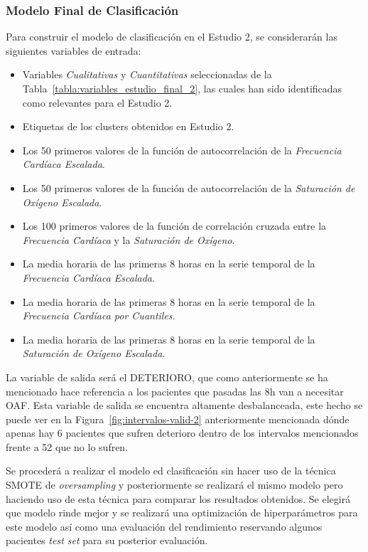 \subsubsection{Modelo Final de Clasificación}

Para construir el modelo de clasificación en el Estudio 2, se considerarán las siguientes variables de entrada:

\begin{itemize}
    \item Variables \textit{Cualitativas} y \textit{Cuantitativas} seleccionadas de la Tabla~\ref{tabla:variables_estudio_final_2}, las cuales han sido identificadas como relevantes para el Estudio 2.
    \item Etiquetas de los clusters obtenidos en Estudio 2.
    \item Los 50 primeros valores de la función de autocorrelación de la \textit{Frecuencia Cardíaca Escalada}.
    \item Los 50 primeros valores de la función de autocorrelación de la \textit{Saturación de Oxígeno Escalada}.
    \item Los 100 primeros valores de la función de correlación cruzada entre la \textit{Frecuencia Cardíaca} y la \textit{Saturación de Oxígeno}.
    \item La media horaria de las primeras 8 horas en la serie temporal de la \textit{Frecuencia Cardíaca Escalada}.
    \item La media horaria de las primeras 8 horas en la serie temporal de la \textit{Frecuencia Cardíaca por Cuantiles}.
    \item La media horaria de las primeras 8 horas en la serie temporal de la \textit{Saturación de Oxígeno Escalada}.
\end{itemize}

La variable de salida será el DETERIORO, que como anteriormente se ha mencionado hace referencia a los pacientes que  pasadas las 8h van a necesitar OAF. Esta variable de salida se encuentra altamente desbalanceada, este hecho se puede ver en la Figura~\ref{fig:intervalos-valid-2} anteriormente mencionada dónde apenas hay 6 pacientes que sufren deterioro dentro de los intervalos mencionados frente a 52 que no lo sufren.

Se procederá a realizar el modelo ed clasificación sin hacer uso de la técnica SMOTE de \textit{oversampling} y posteriormente se realizará el mismo modelo pero haciendo uso de esta técnica para comparar los resultados obtenidos. Se elegirá que modelo rinde mejor y se realizará una optimización de hiperparámetros para este modelo así como una evaluación del rendimiento reservando algunos pacientes \textit{test set} para su posterior evaluación.

